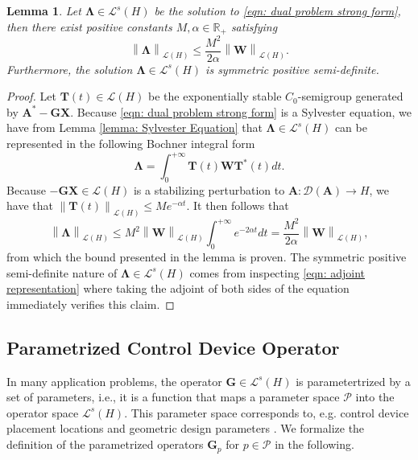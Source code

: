 \documentclass{amsart}
\newcommand{\sL}{\mathscr L}
\newcommand{\p}[1]{\left( {#1} \right)}
\newcommand{\norm}[1]{\left\| #1 \right\|}
\newcommand{\sP}{\mathcal{P}}
\newcommand{\bA}{\mathbf A}
\newcommand{\bX}{\mathbf X}
\newcommand{\bG}{\mathbf G}
\newcommand{\bT}{\mathbf T}
\newcommand{\bLambda}{\boldsymbol{\Lambda}}
\newcommand{\bW}{\mathbf W}
\newtheorem{lemma}{Lemma}
\begin{document}
\begin{lemma} \label{lemma: Lambda bound}
    Let $\bLambda \in \sL^s(H)$ be the solution to \eqref{eqn: dual problem strong form}, then there exist positive constants $M, \alpha \in \mathbb R_+$ satisfying
    $$
    \norm{\bLambda}_{\sL\p{H}} \leq \frac{M^2}{2\alpha}\norm{\bW}_{\sL(H)}.
    $$
    Furthermore, the solution $\bLambda \in \sL^s(H)$ is symmetric positive semi-definite.
\end{lemma}
\begin{proof}
    Let $\bT(t) \in \sL\p{H}$ be the exponentially stable $C_0$-semigroup generated by $\bA^* - \bG \bX$. Because \eqref{eqn: dual problem strong form} is a Sylvester equation,  we have from Lemma \ref{lemma: Sylvester Equation} that $\bLambda \in \sL^s(H)$ can be represented in the following Bochner integral form
    \begin{equation} \label{eqn: adjoint representation}
        \bLambda = \int_0^{+\infty} \bT(t)\bW\bT^*(t)dt.
    \end{equation}
    Because $-\bG\bX \in \sL\p{H}$ is a stabilizing perturbation to $\bA: \mathcal D(\bA) \rightarrow H$, we have that $\norm{\bT(t)}_{\sL\p{H}} \leq Me^{-\alpha t}$. It then follows that
    $$
        \norm{\bLambda}_{\sL\p{H}} \leq  M^2
        \norm{\bW}_{\sL(H)}
        \int_0^{+\infty} e^{-2\alpha t}dt = \frac{M^2}{2\alpha} \norm{\bW}_{\sL(H)},
    $$
    from which the bound presented in the lemma is proven. The symmetric positive semi-definite nature of $\bLambda \in \sL^s(H)$ comes from inspecting \eqref{eqn: adjoint representation} where taking the adjoint of both sides of the equation immediately verifies this claim. 
\end{proof}

\subsection{Parametrized Control Device Operator} \label{subsec: G assumptions}
In many application problems, the operator $\bG \in \sL^s(H)$ is parametertrized by a set of parameters, i.e., it is a function that maps a parameter space $\sP$ into the operator space $\sL^s(H)$. This parameter space corresponds to, e.g. control device placement locations \cite{5482053} and geometric design parameters \cite{edalatzadeh2019optimal}. We formalize the definition of the parametrized operators $\bG_p$ for $p\in\sP$ in the following. 
\end{document}

